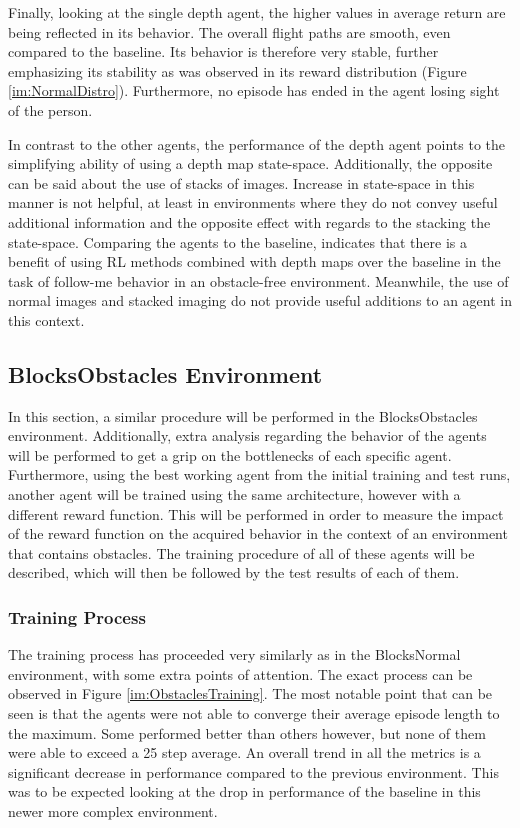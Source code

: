 Finally, looking at the single depth agent, the higher values in average return 
are being reflected in its behavior. 
The overall flight paths are smooth, even compared to the baseline. Its 
behavior is therefore very stable, further emphasizing its stability as was observed 
in its reward distribution (Figure \ref{im:NormalDistro}). Furthermore, no episode 
has ended in the agent losing sight of the person. 

In contrast to the other agents, the performance of the depth agent points to the simplifying
ability of using a depth map state-space. Additionally, the opposite can be said about the 
use of stacks of images. Increase in state-space in this manner is not helpful, at least in 
environments where they do not convey useful additional information
and the opposite effect with regards to the stacking the state-space. Comparing the agents 
to the baseline, indicates that there 
is a benefit of using RL methods combined with depth maps over the baseline in the task of 
follow-me behavior in an obstacle-free environment. Meanwhile, the use of normal images and 
stacked imaging do not provide useful additions to an agent in this context. 

\subsection{BlocksObstacles Environment}
In this section, a similar procedure
will be performed in the BlocksObstacles environment. Additionally, extra analysis 
regarding the behavior of the agents will be performed to get a grip on the bottlenecks of 
each specific agent. Furthermore, using 
the best working agent from the initial training and test runs, another agent will be 
trained using the same architecture, however with a different reward function. This will 
be performed in order to measure the impact of the reward function on the acquired 
behavior in the context of an environment that contains obstacles. The training 
procedure of all of these agents will be described, which will 
then be followed by the test results of each of them. 

\subsubsection{Training Process}
The training process has proceeded 
very similarly as in the BlocksNormal environment, with some extra points of attention. 
The exact process can be observed in 
Figure \ref{im:ObstaclesTraining}. The most 
notable point that can be seen is that the agents were not able to converge their 
average episode length to the maximum. Some performed better than others however, 
but none of them were able to exceed a 25 step average. An overall trend in all the 
metrics is a significant decrease in performance compared to the previous environment. 
This was to be expected looking at the drop in performance of the baseline in this newer
more complex environment. 

